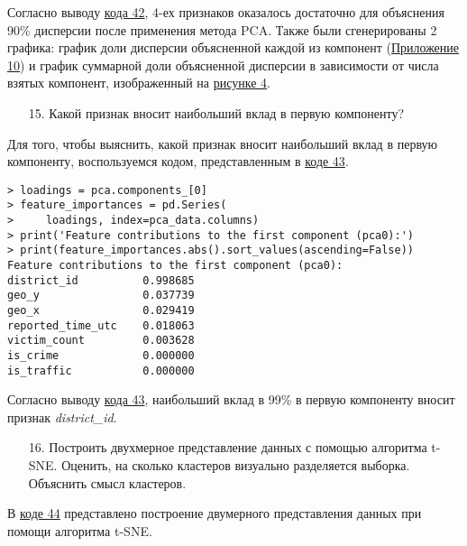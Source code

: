 Согласно выводу \hyperref[code:42]{кода 42}, 4-ех признаков оказалось достаточно для объяснения 90\% дисперсии после применения метода PCA. Также были сгенерированы 2 графика: график доли дисперсии объясненной каждой из компонент (\hyperref[appendix:10]{Приложение 10}) и график суммарной доли объясненной дисперсии в зависимости от числа взятых компонент, изображенный на \hyperref[image:4]{рисунке 4}.

\label{image:4}

\begin{enumerate}
    \item[15.] Какой признак вносит наибольший вклад в первую компоненту?
\end{enumerate}

Для того, чтобы выяснить, какой признак вносит наибольший вклад в первую компоненту, воспользуемся кодом, представленным в \hyperref[code:43]{коде 43}.

\begin{code}
\begin{verbatim}
> loadings = pca.components_[0]
> feature_importances = pd.Series(
>     loadings, index=pca_data.columns)
> print('Feature contributions to the first component (pca0):')
> print(feature_importances.abs().sort_values(ascending=False))
Feature contributions to the first component (pca0):
district_id          0.998685
geo_y                0.037739
geo_x                0.029419
reported_time_utc    0.018063
victim_count         0.003628
is_crime             0.000000
is_traffic           0.000000
\end{verbatim}
\label{code:43}
\end{code}

Согласно выводу \hyperref[code:43]{кода 43}, наибольший вклад в 99\% в первую компоненту вносит признак \textit{district\_id}.

\begin{enumerate}
    \item[16.] Построить двухмерное представление данных с помощью алгоритма t-SNE. Оценить, на сколько кластеров визуально разделяется выборка. Объяснить смысл кластеров.
\end{enumerate}

В \hyperref[code:44]{коде 44} представлено построение двумерного представления данных при помощи алгоритма t-SNE.

